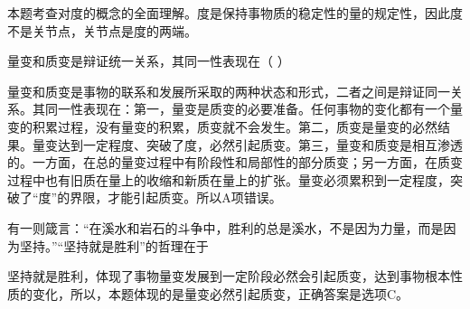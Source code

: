 \begin{solution}本题考查对度的概念的全面理解。度是保持事物质的稳定性的量的规定性，因此度不是关节点，关节点是度的两端。
\end{solution}
\question 量变和质变是辩证统一关系，其同一性表现在（ ）
\par{}
\begin{solution}量变和质变是事物的联系和发展所采取的两种状态和形式，二者之间是辩证同一关系。其同一性表现在：第一，量变是质变的必要准备。任何事物的变化都有一个量变的积累过程，没有量变的积累，质变就不会发生。第二，质变是量变的必然结果。量变达到一定程度、突破了度，必然引起质变。第三，量变和质变是相互渗透的。一方面，在总的量变过程中有阶段性和局部性的部分质变；另一方面，在质变过程中也有旧质在量上的收缩和新质在量上的扩张。量变必须累积到一定程度，突破了``度''的界限，才能引起质变。所以A项错误。
\end{solution}
\question 有一则箴言：``在溪水和岩石的斗争中，胜利的总是溪水，不是因为力量，而是因为坚持。''``坚持就是胜利''的哲理在于
\par{}
\begin{solution}坚持就是胜利，体现了事物量变发展到一定阶段必然会引起质变，达到事物根本性质的变化，所以，本题体现的是量变必然引起质变，正确答案是选项C。
\end{solution}
